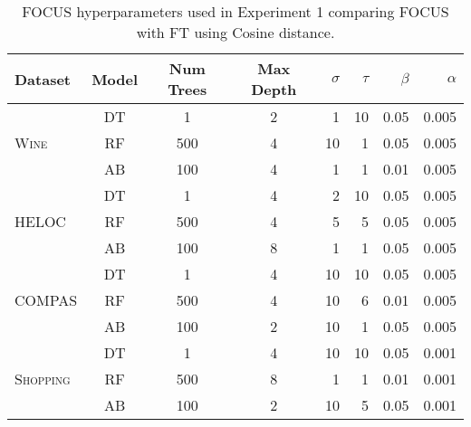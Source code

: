 \begin{table}[h]
\centering
\caption{FOCUS hyperparameters used in Experiment 1 comparing FOCUS with FT using Cosine distance.}
\label{table:hyperparameters-cos}
\begin{tabular}{lcccrrrr}
\toprule
\textbf{Dataset}                   & \textbf{Model}       & \textbf{Num Trees}   & \textbf{Max Depth}   & $\sigma$ & $\tau$ & $\beta$ & $\alpha$ \\ \midrule
	                  & DT                   & 1                                  & 2                                  & 1  & 10 & 0.05 & 0.005      	 \\
\textsc{Wine}                   & RF                   & 500                                & 4                                  & 10 & 1  & 0.05 & 0.005      	 \\
                        & AB                   & 100                                & 4                                  & 1  & 1  & 0.01 & 0.005      	 \\ \midrule
\multirow{3}{*}{\textsc{HELOC}}    & DT                   & 1                                  & 4                                  & 2  & 10 & 0.05 & 0.005  	    \\
                                   & RF                   & 500                                & 4                                  & 5  & 5  & 0.05 & 0.005       	\\
                                   & AB                   & 100                                & 8                                  & 1  & 1  & 0.05 & 0.005   	   \\ \midrule
\multirow{3}{*}{\textsc{COMPAS}}   & DT                   & 1                                  & 4                                  & 10 & 10 & 0.05 & 0.005       \\
                                   & RF                   & 500                                & 4                                  & 10 & 6  & 0.01 & 0.005       \\
                                   & AB                   & 100                                & 2                                  & 10 & 1  & 0.05 & 0.005       	\\ \midrule
\multirow{3}{*}{\textsc{Shopping}} & DT                   & 1                                  & 4                                  & 10 & 10 & 0.05 & 0.001      \\
                                   & RF                   & 500                                & 8                                  & 1  & 1  & 0.01 & 0.001       \\
                                   & AB                   & 100                                & 2                                  & 10 & 5  & 0.05 & 0.001      \\ \bottomrule
\end{tabular}
\end{table}


